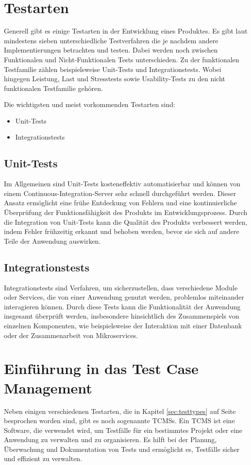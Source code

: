 \documentclass[a4paper, fontsize=11pt, parskip=half, twoside]{scrreprt}
\begin{document}
	
	\section{Testarten} \label{sec:testtypes}
	Generell gibt es einige Testarten in der Entwicklung eines Produktes. 
	Es gibt laut \textcite{atlassian_unterschiedlichen_nodate} mindestens sieben unterschiedliche Testverfahren die je nachdem andere Implementierungen betrachten und testen.
	Dabei werden noch zwischen Funktionalen und Nicht-Funktionalen Tests unterschieden.
	Zu der funktionalen Testfamilie zählen beispielsweise Unit-Tests und Integrationstests.
	Wobei hingegen Leistung, Last und Stresstests sowie Usability-Tests zu den nicht funktionalen Testfamilie gehören.
	\textcite{noauthor_software_nodate}
	
	Die wichtigsten und meist vorkommenden Testarten sind:
	
	\begin{itemize}
		\item Unit-Tests
		\item Integrationstests
	\end{itemize}
	
	\subsection{Unit-Tests}
	Im Allgemeinen sind Unit-Tests kosteneffektiv automatisierbar und können von einem Continuous-Integration-Server sehr schnell durchgeführt werden. 
	Dieser Ansatz ermöglicht eine frühe Entdeckung von Fehlern und eine kontinuierliche Überprüfung der Funktionsfähigkeit des Produkts im Entwicklungsprozess. 
	Durch die Integration von Unit-Tests kann die Qualität des Produkts verbessert werden, indem Fehler frühzeitig erkannt und behoben werden, bevor sie sich auf andere Teile der Anwendung auswirken.
	
	\subsection{Integrationstests}
	Integrationstests sind Verfahren, um sicherzustellen, dass verschiedene Module oder Services, die von einer Anwendung genutzt werden, problemlos miteinander interagieren können. 
	Durch diese Tests kann die Funktionalität der Anwendung insgesamt überprüft werden, insbesondere hinsichtlich des Zusammenspiels von einzelnen Komponenten, wie beispielsweise der Interaktion mit einer Datenbank oder der Zusammenarbeit von Mikroservices.
	
	
	\section{Einführung in das Test Case Management}
	Neben einigen verschiedenen Testarten, die in Kapitel \autoref{sec:testtypes} auf Seite \pageref{sec:testtypes} besprochen worden sind, gibt es noch sogenannte \aclp{TCMS}.
	Ein \acl{TCMS} ist eine Software, die verwendet wird, um Testfälle für ein bestimmtes Projekt oder eine Anwendung zu verwalten und zu organisieren.
	Es hilft bei der Planung, Überwachung und Dokumentation von Tests und ermöglicht es, Testfälle sicher und effizient zu verwalten.
	
\end{document}
